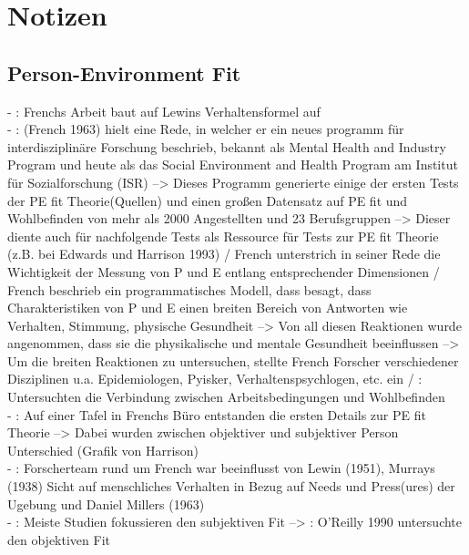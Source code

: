 \chapter{Notizen}
\label{ch:notizen}

\section{Person-Environment Fit}
\label{ch:notizen:personEnvironmentFit}
- \cite[S. 1f.]{caplan:1993}: Frenchs Arbeit baut auf Lewins Verhaltensformel auf \\
- \cite[S. 1f.]{caplan:1993}: (French 1963) hielt eine Rede, in welcher er ein neues programm für interdisziplinäre Forschung beschrieb, bekannt als Mental Health and Industry Program und heute als das Social Environment and Health Program am Institut für Sozialforschung (ISR) --> Dieses Programm generierte einige der ersten Tests der PE fit Theorie(Quellen) und einen großen Datensatz auf PE fit und Wohlbefinden von mehr als 2000 Angestellten und 23 Berufsgruppen --> Dieser diente auch für nachfolgende Tests als Ressource für Tests zur PE fit Theorie (z.B. bei Edwards und Harrison 1993) / French unterstrich in seiner Rede die Wichtigkeit der Messung von P und E entlang entsprechender Dimensionen / French beschrieb ein programmatisches Modell, dass besagt, dass Charakteristiken von P und E einen breiten Bereich von Antworten wie Verhalten, Stimmung, physische Gesundheit --> Von all diesen Reaktionen wurde angenommen, dass sie die physikalische und mentale Gesundheit beeinflussen --> Um die breiten Reaktionen zu untersuchen, stellte French Forscher verschiedener Disziplinen u.a. Epidemiologen, Pyisker, Verhaltenspsychlogen, etc. ein / \cite[S. 4]{caplan:1993}: Untersuchten die Verbindung zwischen Arbeitsbedingungen und Wohlbefinden\\
- \cite[S. 4f.]{caplan:1993}: Auf einer Tafel in Frenchs Büro entstanden die ersten Details zur PE fit Theorie --> Dabei wurden zwischen objektiver und subjektiver Person Unterschied (Grafik von Harrison) \\
- \cite[S. 5]{caplan:1993}: Forscherteam rund um French war beeinflusst von Lewin (1951), Murrays (1938) Sicht auf menschliches Verhalten in Bezug auf Needs und Press(ures) der Ugebung und Daniel Millers (1963) \\
- \cite[S. 9]{caplan:1993}: Meiste Studien fokussieren den subjektiven Fit --> \cite[S. 10]{caplan:1993}: O'Reilly 1990 untersuchte den objektiven Fit\\
